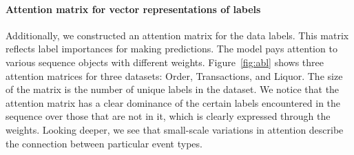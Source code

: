 \documentclass[runningheads]{llncs}
\begin{document}
\paragraph{\textbf{Attention matrix for vector representations of labels}} 
Additionally, we constructed an attention matrix for the data labels. This matrix reflects label importances for making predictions. 
The model pays attention to various sequence objects with different weights. 
Figure~\ref{fig:abl} shows three attention matrices for three datasets: Order, Transactions, and Liquor. The size of the matrix is the number of unique labels in the dataset.
We notice that the attention matrix has a clear dominance of the certain labels encountered in the sequence over those that are not in it, which is clearly expressed through the weights.
Looking deeper, we see that small-scale variations in attention describe the connection between particular event types.

\end{document}
